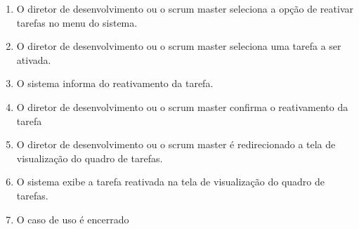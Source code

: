 \begin{enumerate}
  \item O diretor de desenvolvimento ou o scrum master seleciona a opção de reativar tarefas no menu do sistema.
  \item O diretor de desenvolvimento ou o scrum master seleciona uma tarefa a ser ativada.
  \item O sistema informa do reativamento da tarefa.
  \item O diretor de desenvolvimento ou o scrum master confirma o reativamento da tarefa
  \item O diretor de desenvolvimento ou o scrum master é redirecionado a tela de visualização do quadro de tarefas.
  \item O sistema exibe a tarefa reativada na tela de visualização do quadro de tarefas.
  \item O caso de uso é encerrado
\end{enumerate}

